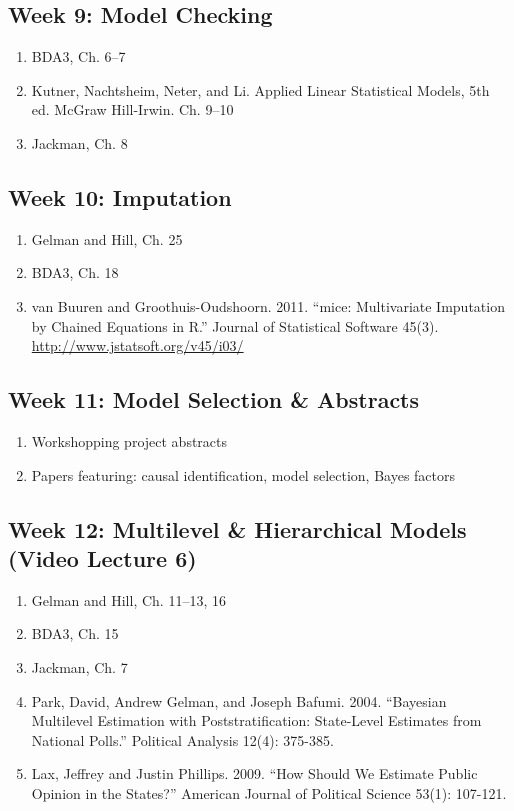 \documentclass[11pt, leqno, fleqn]{article}
\begin{document}
\subsection*{Week 9: Model Checking}
	\begin{enumerate}
	\item[] BDA3, Ch. 6--7
	\item[] Kutner, Nachtsheim, Neter, and Li. Applied Linear Statistical Models, 5th ed.
McGraw Hill-Irwin. Ch. 9--10
	\item[] Jackman, Ch. 8
	\end{enumerate}
\subsection*{Week 10: Imputation}
	\begin{enumerate}
	\item[] Gelman and Hill, Ch. 25
	\item[] BDA3, Ch. 18
	\item[] van Buuren and Groothuis-Oudshoorn. 2011. ``mice: Multivariate Imputation
by Chained Equations in R.'' Journal of Statistical Software 45(3). \url{http://www.jstatsoft.org/v45/i03/}
	\end{enumerate}
\subsection*{Week 11: Model Selection \& Abstracts}
	\begin{enumerate}
	\item[] Workshopping project abstracts
	\item[] Papers featuring: causal identification, model selection, Bayes factors
	\end{enumerate}
\subsection*{Week 12: Multilevel \& Hierarchical Models (Video Lecture 6)}
	\begin{enumerate}
	\item[] Gelman and Hill, Ch. 11--13, 16
	\item[] BDA3, Ch. 15
	\item[] Jackman, Ch. 7
	\item[] Park, David, Andrew Gelman, and Joseph Bafumi. 2004. ``Bayesian Multilevel Estimation with Poststratification: State-Level Estimates from National Polls.'' Political Analysis 12(4): 375-385.
	\item[] Lax, Jeffrey and Justin Phillips. 2009. ``How Should We Estimate Public Opinion in the States?'' American Journal of Political Science 53(1): 107-121.
	\end{enumerate}
\end{document}
